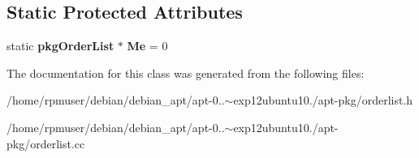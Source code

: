 \subsection*{\-Static \-Protected \-Attributes}
\begin{DoxyCompactItemize}
\item 
static {\bf pkg\-Order\-List} $\ast$ {\bfseries \-Me} = 0\label{classpkgOrderList_a28cf5cef8d1b66dc714ea5e36435287e}

\end{DoxyCompactItemize}


\-The documentation for this class was generated from the following files\-:\begin{DoxyCompactItemize}
\item 
/home/rpmuser/debian/debian\-\_\-apt/apt-\/0..$\sim$exp12ubuntu10./apt-\/pkg/orderlist.\-h\item 
/home/rpmuser/debian/debian\-\_\-apt/apt-\/0..$\sim$exp12ubuntu10./apt-\/pkg/orderlist.\-cc\end{DoxyCompactItemize}
